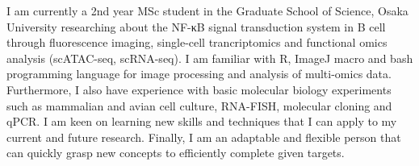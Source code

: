 

\begin{cvparagraph}

I am currently a 2nd year MSc student in the Graduate School of Science, Osaka University researching about the NF-κB signal transduction system in B cell through fluorescence imaging, single-cell trancriptomics and functional omics analysis (scATAC-seq, scRNA-seq). I am familiar with R, ImageJ macro and bash programming language for image processing and analysis of multi-omics data. Furthermore, I also have experience with basic molecular biology experiments such as mammalian and avian cell culture, RNA-FISH, molecular cloning and qPCR. I am keen on learning new skills and techniques that I can apply to my current and future research. Finally, I am an adaptable and flexible person that can quickly grasp new concepts to efficiently complete given targets.
\end{cvparagraph}
